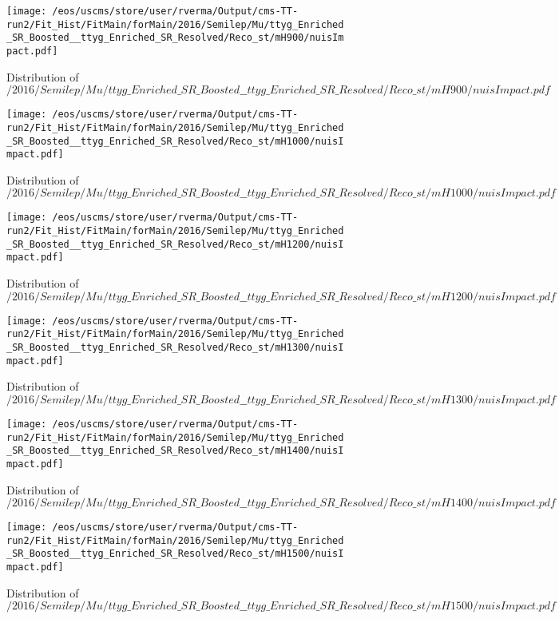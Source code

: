 \begin{figure}
\centering
\texttt{[image: /eos/uscms/store/user/rverma/Output/cms-TT-run2/Fit\_Hist/FitMain/forMain/2016/Semilep/Mu/ttyg\_Enriched\_SR\_Boosted\_\_ttyg\_Enriched\_SR\_Resolved/Reco\_st/mH900/nuisImpact.pdf]}
\caption{Distribution of $/2016/Semilep/Mu/ttyg\_Enriched\_SR\_Boosted\_\_ttyg\_Enriched\_SR\_Resolved/Reco\_st/mH900/nuisImpact.pdf$}
\end{figure}

\begin{figure}
\centering
\texttt{[image: /eos/uscms/store/user/rverma/Output/cms-TT-run2/Fit\_Hist/FitMain/forMain/2016/Semilep/Mu/ttyg\_Enriched\_SR\_Boosted\_\_ttyg\_Enriched\_SR\_Resolved/Reco\_st/mH1000/nuisImpact.pdf]}
\caption{Distribution of $/2016/Semilep/Mu/ttyg\_Enriched\_SR\_Boosted\_\_ttyg\_Enriched\_SR\_Resolved/Reco\_st/mH1000/nuisImpact.pdf$}
\end{figure}

\begin{figure}
\centering
\texttt{[image: /eos/uscms/store/user/rverma/Output/cms-TT-run2/Fit\_Hist/FitMain/forMain/2016/Semilep/Mu/ttyg\_Enriched\_SR\_Boosted\_\_ttyg\_Enriched\_SR\_Resolved/Reco\_st/mH1200/nuisImpact.pdf]}
\caption{Distribution of $/2016/Semilep/Mu/ttyg\_Enriched\_SR\_Boosted\_\_ttyg\_Enriched\_SR\_Resolved/Reco\_st/mH1200/nuisImpact.pdf$}
\end{figure}

\begin{figure}
\centering
\texttt{[image: /eos/uscms/store/user/rverma/Output/cms-TT-run2/Fit\_Hist/FitMain/forMain/2016/Semilep/Mu/ttyg\_Enriched\_SR\_Boosted\_\_ttyg\_Enriched\_SR\_Resolved/Reco\_st/mH1300/nuisImpact.pdf]}
\caption{Distribution of $/2016/Semilep/Mu/ttyg\_Enriched\_SR\_Boosted\_\_ttyg\_Enriched\_SR\_Resolved/Reco\_st/mH1300/nuisImpact.pdf$}
\end{figure}

\begin{figure}
\centering
\texttt{[image: /eos/uscms/store/user/rverma/Output/cms-TT-run2/Fit\_Hist/FitMain/forMain/2016/Semilep/Mu/ttyg\_Enriched\_SR\_Boosted\_\_ttyg\_Enriched\_SR\_Resolved/Reco\_st/mH1400/nuisImpact.pdf]}
\caption{Distribution of $/2016/Semilep/Mu/ttyg\_Enriched\_SR\_Boosted\_\_ttyg\_Enriched\_SR\_Resolved/Reco\_st/mH1400/nuisImpact.pdf$}
\end{figure}

\begin{figure}
\centering
\texttt{[image: /eos/uscms/store/user/rverma/Output/cms-TT-run2/Fit\_Hist/FitMain/forMain/2016/Semilep/Mu/ttyg\_Enriched\_SR\_Boosted\_\_ttyg\_Enriched\_SR\_Resolved/Reco\_st/mH1500/nuisImpact.pdf]}
\caption{Distribution of $/2016/Semilep/Mu/ttyg\_Enriched\_SR\_Boosted\_\_ttyg\_Enriched\_SR\_Resolved/Reco\_st/mH1500/nuisImpact.pdf$}
\end{figure}

